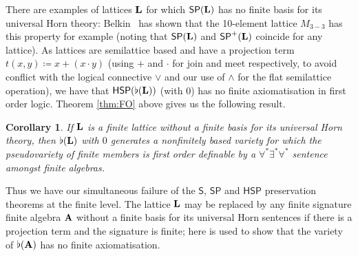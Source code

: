 \documentclass[reqno]{amsart}
\theoremstyle{plain}
\newtheorem{cor}[thm]{Corollary}
\theoremstyle{definition}
\newcommand{\up}[1]{\textup{#1}}
\begin{document}
There are examples of lattices ${\bf L}$ for which $\mathsf{SP}({\bf L})$ has no finite basis for its universal Horn theory: Belkin~\cite{bel} has shown that the 10-element lattice $M_{3{-}3}$ has this property for example (noting that $\mathsf{SP}({\bf L})$ and $\mathsf{SP}^+({\bf L})$ coincide for any lattice).  As lattices are semilattice based and have a projection term $t(x,y)\coloneqq x+(x\cdot y)$ (using $+$ and $\cdot$ for join and meet respectively, to avoid conflict with the logical connective $\vee$ and our use of $\wedge$ for the flat semilattice operation), we have that $\mathsf{HSP}(\flat({\bf L}))$ (with $0$) has no finite axiomatisation in first order logic.  Theorem \ref{thm:FO} above gives us the following result.
\begin{cor}
If ${\bf L}$ is a finite lattice without a finite basis for its universal Horn theory\up, then $\flat({\bf L})$ with $0$ generates a nonfinitely based variety for which the pseudovariety of finite members  is first order definable by a $\forall^*\exists^*\forall^*$ sentence amongst finite algebras.  
\end{cor}
Thus we have our simultaneous failure of the $\mathsf{S}$, $\mathsf{SP}$ and $\mathsf{HSP}$ preservation theorems at the finite level.  
The lattice ${\bf L}$ may be replaced by any finite signature finite algebra ${\bf A}$ without a finite basis for its universal Horn sentences if there is a projection term and the signature is finite; here \cite[Theorem~5.12]{jac:flat} is used to show that the variety of $\flat({\bf A})$ has no finite axiomatisation.
\end{document}
